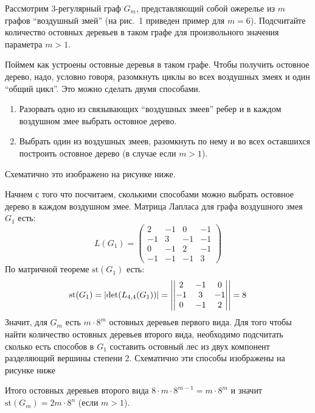 \documentclass[a4paper,12pt,twoside]{article}
\begin{document}
\begin{?}
    Рассмотрим 3-регулярный граф $G_m$, представляющий собой ожерелье из $m$ графов \enquote{воздушный змей} (на рис.~1 приведен пример для $m = 6$). Подсчитайте количество остовных деревьев в таком графе для произвольного значения параметра $m>1$.
    \begin{figure}[h]
        \centering
        \caption{}
    \end{figure}
\end{?}
\begin{solution}{}
    Поймем как устроены остовные деревья в таком графе. Чтобы получить остовное дерево, надо, условно говоря, разомкнуть циклы во всех воздушных змеях и один \enquote{общий цикл}. Это можно сделать двумя способами. 
    \begin{enumerate}[noitemsep,topsep=0pt,parsep=0pt]
        \item Разорвать одно из связывающих \enquote{воздушных змеев} ребер и в каждом воздушном змее выбрать остовное дерево.
        \item Выбрать один из воздушных змеев, разомкнуть по нему и во всех оставшихся построить остовное дерево (в случае если $m > 1$).
    \end{enumerate}
    Схематично это изображено на рисунке ниже.
    \begin{center}
    \end{center}

    Начнем с того что посчитаем, сколькими способами можно выбрать остовное дерево в каждом воздушном змее. Матрица Лапласа для графа воздушного змея $G_1$ есть:
    \[
        L(G_1) = \begin{pmatrix}
            2  & -1 &  0 & -1 \\
            -1 &  3 & -1 & -1 \\
            0  & -1 &  2 & -1 \\
            -1 & -1 & -1 &  3
        \end{pmatrix}
    \]
    По матричной теореме \(\mathrm{st}(G_1)\) есть:
    \[
        \mathrm{st}(G_1) = \lvert\det(L_{4, 4}(G_1))\rvert = \left|\begin{vmatrix}
            2  & -1 &  0 \\
            -1 &  3 & -1 \\
            0  & -1 &  2\\
        \end{vmatrix}\right| = 8
    \]
    Значит, для $G_m$ есть $m \cdot 8^m$ остовных деревьев первого вида. Для того чтобы найти количество остовных деревьев второго вида, необходимо подсчитать сколько есть способов в $G_1$ составить остовный лес из двух компонент разделяющий вершины степени 2. 
    \newpage 
    \noindent Схематично эти способы изображены на рисунке ниже
    \begin{center}
    \end{center}
    Итого остовных деревьев второго вида \(8 \cdot m \cdot 8^{m-1} = m \cdot 8^m\) и значит \(\mathrm{st}(G_m) = 2m \cdot 8^n\) (если $m > 1$).


\end{solution}
\end{document}
